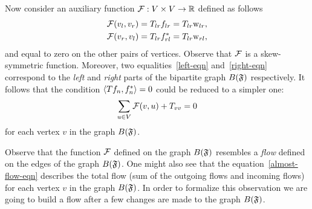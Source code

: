 \documentclass[12pt,oneside,a4paper]{amsart}
\begin{document}
      Now consider an auxiliary function $\mathcal{{F}}: V \times V \to \mathbb{R}$ defined as follows
      \begin{align*}
        &\mathcal{{F}}(v_l, v_r) = T_{lr} f_{lr} = T_{lr} \mathrm{w}_{lr},\\
        &\mathcal{{F}}(v_r, v_l) = T_{lr} f^*_{rl} = T_{lr} \mathrm{w}_{rl},
      \end{align*}
      and equal to zero on the other pairs of vertices.
      Observe that $\mathcal{{F}}$ is a skew-symmetric function.
      Moreover, two equalities~\eqref{left-eqn} and~\eqref{right-eqn} correspond to the \emph{left} and \emph{right}
        parts of the bipartite graph $B(\mathfrak{F})$ respectively.
      It follows that the condition $\langle Tf_n, f_n^* \rangle = 0$ could be reduced to a simpler one:
      \begin{equation}
        \label{almost-flow-eqn}
        \sum_{u \in V} \mathcal{{F}}(v, u) + T_{vv} = 0
      \end{equation}
        for each vertex $v$ in the graph $B(\mathfrak{F})$.
      \begin{remark}
        Observe that the function $\mathcal{{F}}$ defined on the graph $B(\mathfrak{F})$ resembles
          a \emph{flow} defined on the edges of the graph $B(\mathfrak{F})$.
        One might also see that the equation~\eqref{almost-flow-eqn} describes the total flow (sum of the outgoing flows and incoming flows) 
          for each vertex $v$ in the graph $B(\mathfrak{F})$.
        In order to formalize this observation we are going to build a flow
          after a few changes are made to the graph $B(\mathfrak{F})$.
      \end{remark}

    \medskip
\end{document}
